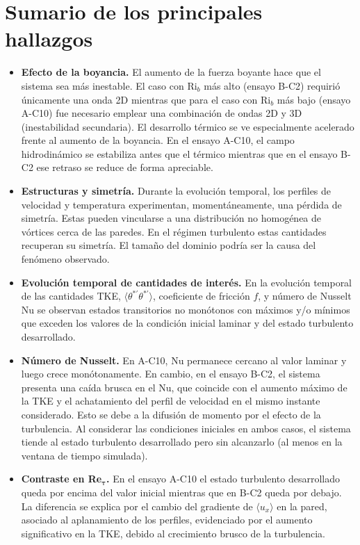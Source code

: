 \newpage

\section{Sumario de los principales hallazgos}

\begin{itemize}
  
  \item \textbf{Efecto de la boyancia.} El aumento de la fuerza boyante hace que el sistema sea más inestable. El caso con Ri$_b$ más alto (ensayo B-C2) requirió únicamente una onda 2D mientras que para el caso con Ri$_b$ más bajo (ensayo A-C10) fue necesario emplear una combinación de ondas 2D y 3D (inestabilidad secundaria). El desarrollo térmico se ve especialmente acelerado frente al aumento de la boyancia. En el ensayo A-C10, el campo hidrodinámico se estabiliza antes que el térmico mientras que en el ensayo B-C2 ese retraso se reduce de forma apreciable.
  
 \item \textbf{Estructuras y simetría.} Durante la evolución temporal, los perfiles de velocidad y temperatura experimentan, momentáneamente, una pérdida de simetría. Estas pueden vincularse a una distribución no homogénea de vórtices cerca de las paredes. En el \linebreak régimen turbulento estas cantidades recuperan su simetría. El tamaño del dominio podría ser la causa del fenómeno observado.  
  
  \item \textbf{Evolución temporal de cantidades de interés.} En la evolución temporal de las cantidades TKE, $\langle \theta^{* \prime} \theta^{* \prime} \rangle$, coeficiente de fricción $f$, y número de Nusselt Nu se observan estados transitorios no monótonos con máximos y/o mínimos que exceden los valores de la condición inicial laminar y del estado turbulento desarrollado.
  
  \item \textbf{Número de Nusselt.} En A-C10, Nu permanece cercano al valor laminar y luego crece monótonamente. En cambio, en el ensayo B-C2, el sistema presenta una caída brusca en el Nu, que coincide con el aumento máximo de la TKE y el achatamiento del perfil de velocidad en el mismo instante considerado. Esto se debe a la difusión de momento por el efecto de la turbulencia. Al considerar las condiciones iniciales en ambos casos, el sistema tiende al estado turbulento desarrollado pero sin alcanzarlo (al menos en la ventana de tiempo simulada).
    
  \item \textbf{Contraste en Re$\mathbf{_{\tau}}$.} En el ensayo A-C10 el estado turbulento desarrollado queda por encima del valor inicial mientras que en B-C2 queda por debajo. La diferencia se explica por el cambio del gradiente de $\langle u_x \rangle$ en la pared, asociado al aplanamiento de los perfiles, evidenciado por el aumento significativo en la TKE, debido al crecimiento brusco de la turbulencia.

\end{itemize}

